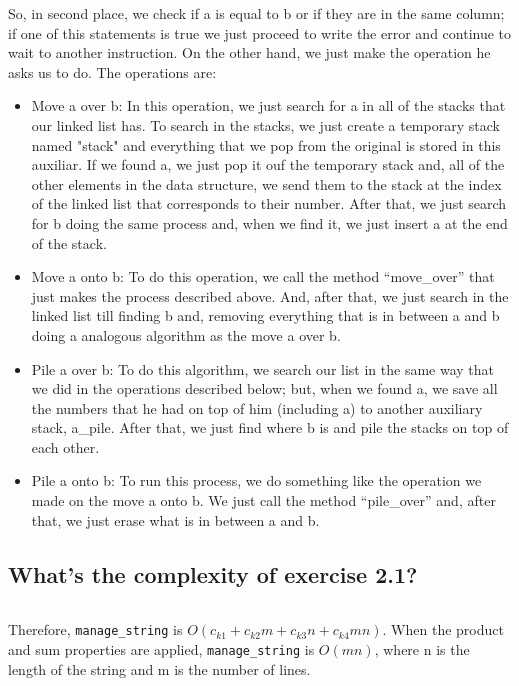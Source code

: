 \documentclass[a4paper,12pt]{article}
\begin{document}
    So, in second place, we check if a is equal to b or if they are in the same
    column; if one of this statements is true we just proceed to write the error
    and continue to wait to another instruction. On the other hand, we just make
    the operation he asks us to do. The operations are:
      \begin{itemize}
        \item Move a over b:
      In this operation, we just search for a in all of the stacks that our
      linked list has. To search in the stacks, we just create a temporary
      stack named "stack" and everything that we pop from the original is
      stored in this auxiliar. If we found a, we just pop it ouf the
      temporary stack and, all of the other elements in the data structure,
      we send them to the stack at the index of the linked list that
      corresponds to their number. After that, we just search for b doing
      the same process and, when we find it, we just insert a at the end of
      the stack.

      \item Move a onto b:
      To do this operation, we call the method ``move\_over'' that just makes
      the process described above. And, after that, we just search in the
      linked list till finding b and, removing everything that is in between
      a and b doing a analogous algorithm as the move a over b.

      \item Pile a over b:
      To do this algorithm, we search our list in the same way that we did
      in the operations described below; but, when we found a, we save all
      the numbers that he had on top of him (including a) to another
      auxiliary stack, a\_pile. After that, we just find where b is and
      pile the stacks on top of each other.

      \item Pile a onto b:
      To run this process, we do something like the operation we made on the
      move a onto b. We just call the method ``pile\_over'' and, after that,
      we just erase what is in between a and b.
      \end{itemize}

    \subsection{What's the complexity of exercise 2.1?}
      \begin{Verbatim}

      \end{Verbatim}
      Therefore, \texttt{manage\_string} is $O(c_{k1}+c_{k2}m+c_{k3}n+c_{k4}mn)$.
      When the product and sum properties are applied, \texttt{manage\_string} is $O(mn)$,
      where n is the length of the string and m is the number of lines.
\end{document}
